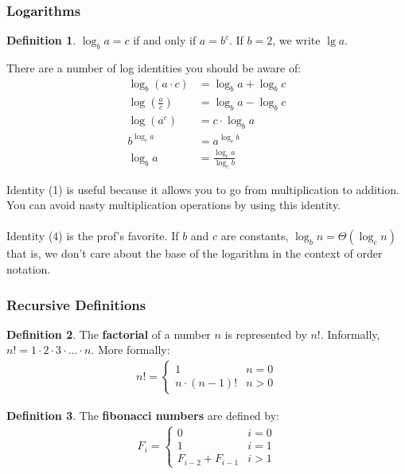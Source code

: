\documentclass[]{article}
\theoremstyle{definition}
\newtheorem*{defn}{Definition}
\begin{document}
			\subsubsection{Logarithms}
				\begin{defn}
					$\log_b a = c$ if and only if $a = b^c$. If $b = 2$, we write $\lg a$. 
				\end{defn}

				There are a number of log identities you should be aware of:
				\begin{align}
					\log_b (a \cdot c) &= \log_b a + \log_b c \\
					\log \left( \frac{a}{c} \right) &= \log_b a - \log_b c \\
					\log(a^c) &= c \cdot \log_b a \\
					b^{\log_c a} &= a^{\log_c b} \\
					\log_b a &= \frac{\log_c a}{\log_c b} 
				\end{align}

				Identity (1) is useful because it allows you to go from multiplication to addition. You can avoid nasty multiplication operations by using this identity.
				\\ \\
				Identity (4) is the prof's favorite. If $b$ and $c$ are constants, $\log_b n = \Theta(\log_c n)$ \textendash{} that is, we don't care about the base of the logarithm in the context of order notation.
			\subsubsection{Recursive Definitions}
				\begin{defn}
					The \textbf{factorial} of a number $n$ is represented by $n!$. Informally, $n! = 1 \cdot 2 \cdot 3 \cdot \ldots \cdot n$. More formally:
					\begin{align*}
						n! = \begin{cases}
							1 & n = 0 \\
							n \cdot (n - 1)! & n > 0
						\end{cases}
					\end{align*}
				\end{defn}

				\begin{defn}
					The \textbf{fibonacci numbers} are defined by:
					\begin{align*}
						F_i = \begin{cases}
							0 & i = 0 \\
							1 & i = 1 \\
							F_{i - 2} + F_{i - 1} & i > 1
						\end{cases}
					\end{align*}
				\end{defn}
\end{document}
